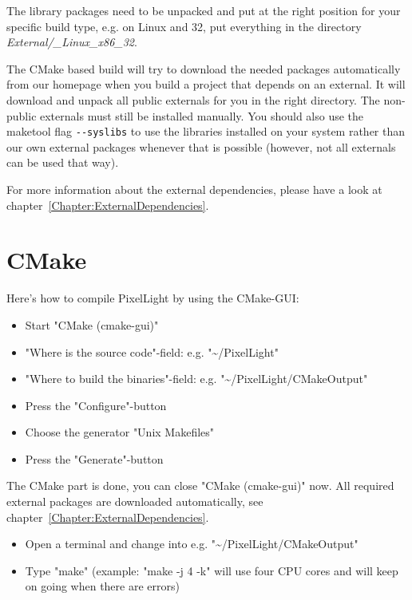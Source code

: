 The library packages need to be unpacked and put at the right position for your specific build type, e.g. on Linux and \SI{32}{\bit}, put everything in the directory \emph{External/\_Linux\_x86\_32}.

The CMake based build will try to download the needed packages automatically from our homepage when you build a project that depends on an external. It will download and unpack all public externals for you in the right directory. The non-public externals must still be installed manually. You should also use the maketool flag \verb+--syslibs+ to use the libraries installed on your system rather than our own external packages whenever that is possible (however, not all externals can be used that way).

For more information about the external dependencies, please have a look at chapter~\ref{Chapter:ExternalDependencies}.




\section{CMake}
\label{Chapter:Linux_CMake}
Here's how to compile PixelLight by using the CMake-\ac{GUI}:
\begin{itemize}
\item{Start "CMake (cmake-gui)"}
\item{"Where is the source code"-field: e.g. "\textasciitilde /PixelLight"}
\item{"Where to build the binaries"-field: e.g. "\textasciitilde /PixelLight/CMakeOutput"}
\item{Press the "Configure"-button}
\item{Choose the generator "Unix Makefiles"}
\item{Press the "Generate"-button}
\end{itemize}

The CMake part is done, you can close "CMake (cmake-gui)" now. All required external packages are downloaded automatically, see chapter~\ref{Chapter:ExternalDependencies}.
\begin{itemize}
\item{Open a terminal and change into e.g. "\textasciitilde /PixelLight/CMakeOutput"}
\item{Type "make" (example: "make -j 4 -k" will use four \ac{CPU} cores and will keep on going when there are errors)}
\end{itemize}




